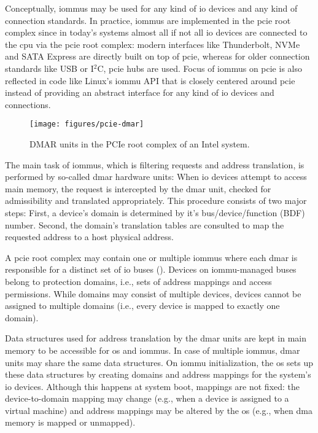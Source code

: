 Conceptually, \acp{iommu} may be used for any kind of \ac{io} devices and any
kind of connection standards. In practice, \acp{iommu} are implemented in the
\ac{pcie} root complex since in today's systems almost all if not all \ac{io}
devices are connected to the \ac{cpu} via the \ac{pcie} root complex: modern
interfaces like Thunderbolt, NVMe and SATA Express are directly built on top of
\ac{pcie}, whereas for older connection standards like USB or I$^2$C, \ac{pcie}
hubs are used. Focus of \acp{iommu} on \ac{pcie} is also reflected in code like
Linux's \ac{iommu} API that is closely centered around \ac{pcie} instead of
providing an abstract interface for any kind of \ac{io} devices and connections.

\begin{figure}
    \centering
    \texttt{[image: figures/pcie-dmar]}
    \caption{DMAR units in the PCIe root complex of an Intel system.}
    \label{fig:pcie-dmar}
\end{figure}

The main task of \acp{iommu}, which is filtering requests and address
translation, is performed by so-called \ac{dmar} hardware units: When \ac{io}
devices attempt to access main memory, the request is intercepted by the
\ac{dmar} unit, checked for admissibility and translated appropriately. This
procedure consists of two major steps: First, a device's domain is determined by
it's bus/device/function (BDF) number. Second, the domain's translation tables
are consulted to map the requested address to a host physical address.

A \ac{pcie} root complex may contain one or multiple \acp{iommu} where each
\ac{dmar} is responsible for a distinct set of \ac{io} buses
(). Devices on \ac{iommu}-managed buses belong to protection
domains, i.e., sets of address mappings and access permissions. While domains
may consist of multiple devices, devices cannot be assigned to multiple domains
(i.e., every device is mapped to exactly one domain).

Data structures used for address translation by the \ac{dmar} units are kept in
main memory to be accessible for \ac{os} and \acp{iommu}. In case of multiple
\acp{iommu}, \ac{dmar} units may share the same data structures. On \ac{iommu}
initialization, the \ac{os} sets up these data structures by creating domains
and address mappings for the system's \ac{io} devices. Although this happens at
system boot, mappings are not fixed: the device-to-domain mapping may change
(e.g., when a device is assigned to a virtual machine) and address mappings may
be altered by the \ac{os} (e.g., when \ac{dma} memory is mapped or unmapped).

